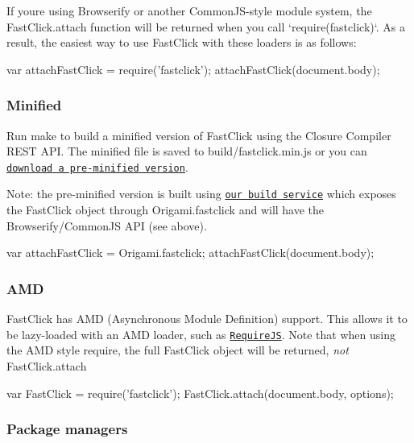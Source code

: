 If you\textquotesingle{}re using Browserify or another Common\+J\+S-\/style module system, the {\ttfamily Fast\+Click.\+attach} function will be returned when you call `require(\textquotesingle{}fastclick\textquotesingle{})`. As a result, the easiest way to use Fast\+Click with these loaders is as follows\+:


\begin{DoxyCode}
var attachFastClick = require('fastclick');
attachFastClick(document.body);
\end{DoxyCode}


\subsubsection*{Minified}

Run {\ttfamily make} to build a minified version of Fast\+Click using the Closure Compiler R\+E\+ST A\+PI. The minified file is saved to {\ttfamily build/fastclick.\+min.\+js} or you can \href{http://build.origami.ft.com/bundles/js?modules=fastclick}{\tt download a pre-\/minified version}.

Note\+: the pre-\/minified version is built using \href{http://origami.ft.com/docs/developer-guide/build-service/}{\tt our build service} which exposes the {\ttfamily Fast\+Click} object through {\ttfamily Origami.\+fastclick} and will have the Browserify/\+Common\+JS A\+PI (see above).


\begin{DoxyCode}
var attachFastClick = Origami.fastclick;
attachFastClick(document.body);
\end{DoxyCode}


\subsubsection*{A\+MD}

Fast\+Click has A\+MD (Asynchronous Module Definition) support. This allows it to be lazy-\/loaded with an A\+MD loader, such as \href{http://requirejs.org/}{\tt Require\+JS}. Note that when using the A\+MD style require, the full {\ttfamily Fast\+Click} object will be returned, {\itshape not} {\ttfamily Fast\+Click.\+attach}


\begin{DoxyCode}
var FastClick = require('fastclick');
FastClick.attach(document.body, options);
\end{DoxyCode}


\subsubsection*{Package managers}

